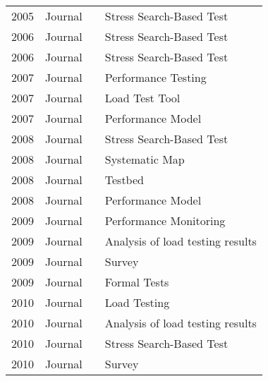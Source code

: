 \begin{table}[]
\begin{tabular}{llll}
2005          & Journal          & \cite{Pohlheim2005}             & Stress Search-Based Test         \\
2006          & Journal          & \cite{Garousi2006}              & Stress Search-Based Test         \\
2006          & Journal          & \cite{Garousi2006}\cite{Ag2006} & Stress Search-Based Test         \\
2007          & Journal          & \cite{Cai2007}                  & Performance Testing              \\
2007          & Journal          & \cite{Nevedrov2007}             & Load Test Tool                   \\
2007          & Journal          & \cite{Fritzsche2007}            & Performance Model                \\
2008          & Journal          & \cite{Bayan2008}                & Stress Search-Based Test         \\
2008          & Journal          & \cite{Afzal2008}                & Systematic Map                   \\
2008          & Journal          & \cite{Bertolino2008}            & Testbed                          \\
2008          & Journal          & \cite{Lutteroth2008}            & Performance Model                \\
2009          & Journal          & \cite{Acharya2009}              & Performance Monitoring           \\
2009          & Journal          & \cite{Jiang2009a}               & Analysis of load testing results \\
2009          & Journal          & \cite{Afzal2009a}               & Survey                           \\
2009          & Journal          & \cite{Hierons2009}              & Formal Tests                     \\
2010          & Journal          & \cite{Wang2010}                 & Load Testing                     \\
2010          & Journal          & \cite{Malik2010b}               & Analysis of load testing results \\
2010          & Journal          & \cite{Garousi2010d}             & Stress Search-Based Test         \\
2010          & Journal          & \cite{White2010}                & Survey                           \\

\end{tabular}
\end{table}
